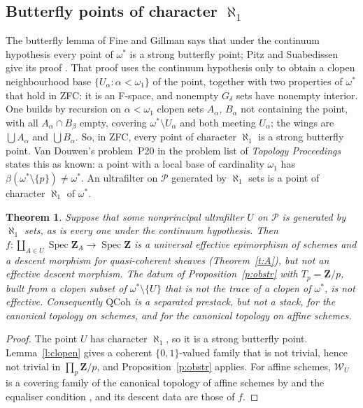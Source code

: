 \documentclass[11pt,a4paper]{amsart}
\newtheorem{theorem}{Theorem}[section]
\theoremstyle{definition}
\theoremstyle{remark}
\newcommand{\Z}{\mathbf Z}
\newcommand{\Pp}{\mathcal P}
\newcommand{\QCoh}{\mathrm{QCoh}}
\newcommand{\Spec}{\operatorname{Spec}}
\begin{document}
\subsection{Butterfly points of character \texorpdfstring{$\aleph_1$}{aleph1}}
The butterfly lemma of Fine and Gillman \cite{fg} says that under the continuum hypothesis every point of $\omega^*$ is a strong butterfly point; Pitz and Suabedissen give its proof \cite[Lemma~3.1]{pitz}. That proof uses the continuum hypothesis only to obtain a clopen neighbourhood base $\{U_\alpha:\alpha<\omega_1\}$ of the point, together with two properties of $\omega^*$ that hold in ZFC: it is an F-space, and nonempty $G_\delta$ sets have nonempty interior. One builds by recursion on $\alpha<\omega_1$ clopen sets $A_\alpha$, $B_\alpha$ not containing the point, with all $A_\alpha\cap B_\beta$ empty, covering $\omega^*\setminus U_\alpha$ and both meeting $U_\alpha$; the wings are $\bigcup A_\alpha$ and $\bigcup B_\alpha$. So, in ZFC, every point of character $\aleph_1$ is a strong butterfly point. Van Douwen's problem~P20 in the problem list of \emph{Topology Proceedings} \cite{pearl} states this as known: a point with a local base of cardinality $\omega_1$ has $\beta(\omega^*\setminus\{p\})\neq\omega^*$. An ultrafilter on $\Pp$ generated by $\aleph_1$ sets is a point of character $\aleph_1$ of $\omega^*$.

\begin{theorem}\label{t:C}
Suppose that some nonprincipal ultrafilter $U$ on $\Pp$ is generated by $\aleph_1$ sets, as is every one under the continuum hypothesis. Then $f\colon\coprod_{A\in U}\Spec\Z_A\to\Spec\Z$ is a universal effective epimorphism of schemes \cite[0EUG]{stacks} and a descent morphism for quasi-coherent sheaves (Theorem~\ref{t:A}), but not an effective descent morphism. The datum of Proposition~\ref{p:obstr} with $T_p=\Z/p$, built from a clopen subset of $\omega^*\setminus\{U\}$ that is not the trace of a clopen of $\omega^*$, is not effective. Consequently $\QCoh$ is a separated prestack, but not a stack, for the canonical topology on schemes, and for the canonical topology on affine schemes.
\end{theorem}

\begin{proof}
The point $U$ has character $\aleph_1$, so it is a strong butterfly point. Lemma~\ref{l:clopen} gives a coherent $\{0,1\}$-valued family that is not trivial, hence not trivial in $\prod_p\Z/p$, and Proposition~\ref{p:obstr} applies. For affine schemes, $\mathcal W_U$ is a covering family of the canonical topology of affine schemes by \cite[0EUA]{stacks} and the equaliser condition \cite[0EUF]{stacks}, and its descent data are those of $f$.
\end{proof}
\end{document}
